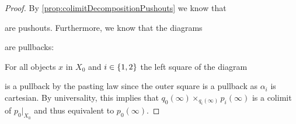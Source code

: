 \begin{lemma}
\begin{proof}
        By \cref{prop:colimitDecompositionPushouts} we know that
        \begin{center}
        \end{center}
        are pushouts.
        Furthermore, we know that the diagrams 
        \begin{center}
        \end{center}
        are pullbacks: 

        For all objects $x$ in $X_0$ and $i\in\left\lbrace1,2\right\rbrace$ the left square of the diagram 
        \begin{center}
        \end{center}
        is a pullback by the pasting law since the outer square is a pullback as $\alpha_i$ is cartesian.
        By universality, this implies that $q_0(\infty)\times_{q_i(\infty)}p_i(\infty)$ is a colimit of $p_0|_{X_0}$ and thus equivalent to $p_0(\infty)$.


\end{proof}
\end{lemma}

